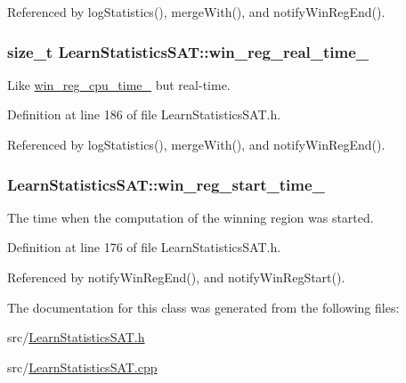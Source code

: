 Referenced by log\-Statistics(), merge\-With(), and notify\-Win\-Reg\-End().

\hypertarget{classLearnStatisticsSAT_a97f7a6ccfc2d6677ae8a6c16dddd6b71}{
\subsubsection[{win\-\_\-reg\-\_\-real\-\_\-time\-\_\-}]{\setlength{\rightskip}{0pt plus 5cm}size\-\_\-t Learn\-Statistics\-S\-A\-T\-::win\-\_\-reg\-\_\-real\-\_\-time\-\_\-\hspace{0.3cm}{\ttfamily [protected]}}}\label{classLearnStatisticsSAT_a97f7a6ccfc2d6677ae8a6c16dddd6b71}


Like \hyperlink{classLearnStatisticsSAT_af9823be5155743223790ae01b91b7ca8}{win\-\_\-reg\-\_\-cpu\-\_\-time\-\_\-} but real-\/time. 



Definition at line 186 of file Learn\-Statistics\-S\-A\-T.\-h.



Referenced by log\-Statistics(), merge\-With(), and notify\-Win\-Reg\-End().

\hypertarget{classLearnStatisticsSAT_a04c8091b3380c8d756d40aabeefbfbe1}{
\subsubsection[{win\-\_\-reg\-\_\-start\-\_\-time\-\_\-}]{ Learn\-Statistics\-S\-A\-T\-::win\-\_\-reg\-\_\-start\-\_\-time\-\_\-\hspace{0.3cm}{\ttfamily [protected]}}}\label{classLearnStatisticsSAT_a04c8091b3380c8d756d40aabeefbfbe1}


The time when the computation of the winning region was started. 



Definition at line 176 of file Learn\-Statistics\-S\-A\-T.\-h.



Referenced by notify\-Win\-Reg\-End(), and notify\-Win\-Reg\-Start().



The documentation for this class was generated from the following files\-:\begin{DoxyCompactItemize}
\item 
src/\hyperlink{LearnStatisticsSAT_8h}{Learn\-Statistics\-S\-A\-T.\-h}\item 
src/\hyperlink{LearnStatisticsSAT_8cpp}{Learn\-Statistics\-S\-A\-T.\-cpp}\end{DoxyCompactItemize}
